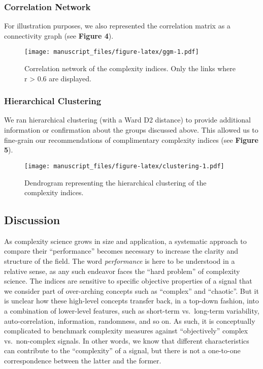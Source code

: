 \documentclass[
  man]{apa6}
\begin{document}
\hypertarget{correlation-network}{%
\subsubsection{Correlation Network}\label{correlation-network}}

For illustration purposes, we also represented the correlation matrix as a connectivity graph (see \textbf{Figure 4}).

\begin{figure}
\centering
\texttt{[image: manuscript\_files/figure-latex/ggm-1.pdf]}
\caption{\label{fig:ggm}Correlation network of the complexity indices. Only the links where \textbar r\textbar{} \textgreater{} 0.6 are displayed.}
\end{figure}

\hypertarget{hierarchical-clustering}{%
\subsubsection{Hierarchical Clustering}\label{hierarchical-clustering}}

We ran hierarchical clustering (with a Ward D2 distance) to provide additional information or confirmation about the groups discussed above. This allowed us to fine-grain our recommendations of complimentary complexity indices (see \textbf{Figure 5}).

\begin{figure}
\centering
\texttt{[image: manuscript\_files/figure-latex/clustering-1.pdf]}
\caption{\label{fig:clustering}Dendrogram representing the hierarchical clustering of the complexity indices.}
\end{figure}

\hypertarget{discussion}{%
\subsection{Discussion}\label{discussion}}

As complexity science grows in size and application, a systematic approach to compare their ``performance'' becomes necessary to increase the clarity and structure of the field. The word \emph{performance} is here to be understood in a relative sense, as any such endeavor faces the ``hard problem'' of complexity science. The indices are sensitive to specific objective properties of a signal that we consider part of over-arching concepts such as ``complex'' and ``chaotic''. But it is unclear how these high-level concepts transfer back, in a top-down fashion, into a combination of lower-level features, such as short-term vs.~long-term variability, auto-correlation, information, randomness, and so on. As such, it is conceptually complicated to benchmark complexity measures against ``objectively'' complex vs.~non-complex signals. In other words, we know that different characteristics can contribute to the ``complexity'' of a signal, but there is not a one-to-one correspondence between the latter and the former.
\end{document}
